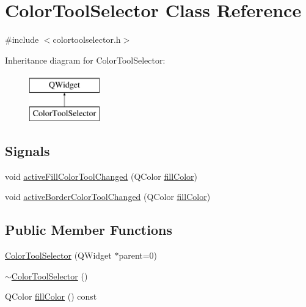 \hypertarget{class_color_tool_selector}{}\section{Color\+Tool\+Selector Class Reference}
\label{class_color_tool_selector}


{\ttfamily \#include $<$colortoolselector.\+h$>$}

Inheritance diagram for Color\+Tool\+Selector\+:\begin{figure}[H]
\begin{center}
\leavevmode
\includegraphics[height=2.000000cm]{class_color_tool_selector}
\end{center}
\end{figure}
\subsection*{Signals}
\begin{DoxyCompactItemize}
\item 
void \hyperlink{class_color_tool_selector_a36ab517be160748460a07eb0599023f6}{active\+Fill\+Color\+Tool\+Changed} (Q\+Color \hyperlink{class_color_tool_selector_ad1976b1daefca06700111da01edff3d4}{fill\+Color})
\item 
void \hyperlink{class_color_tool_selector_acfb60e1e55b31e4d784feab0552874d2}{active\+Border\+Color\+Tool\+Changed} (Q\+Color \hyperlink{class_color_tool_selector_ad1976b1daefca06700111da01edff3d4}{fill\+Color})
\end{DoxyCompactItemize}
\subsection*{Public Member Functions}
\begin{DoxyCompactItemize}
\item 
\hyperlink{class_color_tool_selector_a42acf2fbc6dea5c4575ed166f3362c92}{Color\+Tool\+Selector} (Q\+Widget $\ast$parent=0)
\item 
\hyperlink{class_color_tool_selector_a461eb04b3d3d25bee5bb5848488f0b0d}{$\sim$\+Color\+Tool\+Selector} ()
\item 
Q\+Color \hyperlink{class_color_tool_selector_ad1976b1daefca06700111da01edff3d4}{fill\+Color} () const
\end{DoxyCompactItemize}
